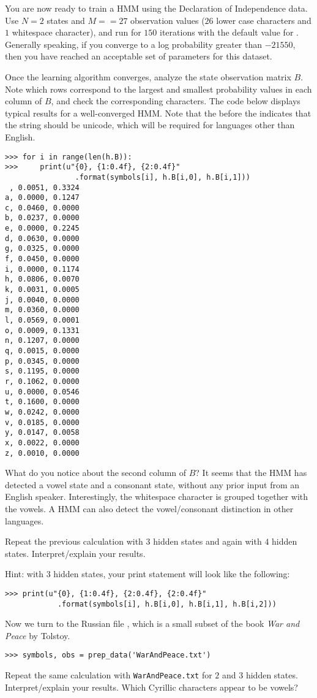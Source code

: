 \begin{problem}
You are now ready to train a HMM using the Declaration of Independence data.
Use $N=2$ states and $M=$$=27$ observation values ($26$ lower case characters and $1$ whitespace character),
and run for $150$ iterations with the default value for .
Generally speaking, if you converge to a log probability greater than $-21550$, then you have reached
an acceptable set of parameters for this dataset.

Once the learning algorithm converges, analyze the state observation matrix $B$.
Note which rows correspond to the largest and smallest probability values in each column of $B$,
and check the corresponding characters.
The code below displays typical results for a well-converged HMM. 
Note that the  before the  indicates that the string should be unicode, which will be required for languages other than English.
\begin{lstlisting}
>>> for i in range(len(h.B)):
>>>     print(u"{0}, {1:0.4f}, {2:0.4f}"
                .format(symbols[i], h.B[i,0], h.B[i,1]))
 , 0.0051, 0.3324
a, 0.0000, 0.1247
c, 0.0460, 0.0000
b, 0.0237, 0.0000
e, 0.0000, 0.2245
d, 0.0630, 0.0000
g, 0.0325, 0.0000
f, 0.0450, 0.0000
i, 0.0000, 0.1174
h, 0.0806, 0.0070
k, 0.0031, 0.0005
j, 0.0040, 0.0000
m, 0.0360, 0.0000
l, 0.0569, 0.0001
o, 0.0009, 0.1331
n, 0.1207, 0.0000
q, 0.0015, 0.0000
p, 0.0345, 0.0000
s, 0.1195, 0.0000
r, 0.1062, 0.0000
u, 0.0000, 0.0546
t, 0.1600, 0.0000
w, 0.0242, 0.0000
v, 0.0185, 0.0000
y, 0.0147, 0.0058
x, 0.0022, 0.0000
z, 0.0010, 0.0000
\end{lstlisting}
What do you notice about the second column of $B$? It seems that the HMM has detected a vowel state and a consonant state, without any prior input from an English speaker.
Interestingly, the whitespace character is grouped together with the vowels. A HMM can also detect the vowel/consonant distinction in other languages.
\end{problem}

\begin{problem}
Repeat the previous calculation with $3$ hidden states and again with $4$ hidden states.  Interpret/explain your results.

\noindent Hint: with $3$ hidden states, your print statement will look like the following:
\begin{lstlisting}
>>> print(u"{0}, {1:0.4f}, {2:0.4f}, {2:0.4f}"
            .format(symbols[i], h.B[i,0], h.B[i,1], h.B[i,2]))
\end{lstlisting}

\end{problem}


Now we turn to the Russian file , which is a small subset of the book \emph{War and Peace} by Tolstoy.
\begin{lstlisting}
>>> symbols, obs = prep_data('WarAndPeace.txt')
\end{lstlisting}

\begin{problem}
Repeat the same calculation with \texttt{WarAndPeace.txt} for $2$ and $3$ hidden states.
Interpret/explain your results.  Which Cyrillic characters appear to be vowels?
\end{problem}

